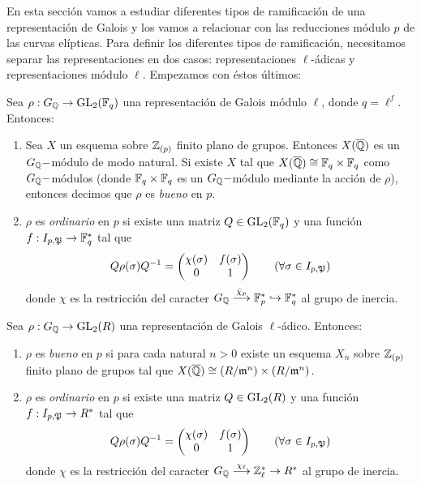 En esta secci\'on vamos a estudiar diferentes tipos de ramificaci\'on de una representaci\'on de
Galois y los vamos a relacionar con las reducciones m\'odulo $p$ de las curvas el\'ipticas. Para
definir los diferentes tipos de ramificaci\'on, necesitamos separar las representaciones en dos
casos: representaciones $\ell$-\'adicas y representaciones m\'odulo $\ell$. Empezamos con \'estos
\'ultimos:

\begin{defin}
  Sea $\rho:G_{\mathbb{Q}}\rightarrow\mathrm{GL}_2(\mathbb{F}_{q})$ una representaci\'on de Galois m\'odulo $\ell$, donde $q=\ell^f$.
  Entonces:
  \begin{enumerate}
  \item Sea $X$ un esquema sobre $\mathbb{Z}_{(p)}$ finito plano de grupos. Entonces $X(\overline{\mathbb{Q}})$ es
    un $G_{\mathbb{Q}}-$m\'odulo de modo natural. Si existe $X$ tal que $X(\overline{\mathbb{Q}})\cong\mathbb{F}_q\times\mathbb{F}_q$
    como $G_{\mathbb{Q}}-$m\'odulos (donde $\mathbb{F}_q\times\mathbb{F}_q$ es un $G_{\mathbb{Q}}-$m\'odulo mediante la acci\'on de
    $\rho$), entonces decimos que $\rho$ es \emph{bueno} en $p$. 
  \item $\rho$ es \emph{ordinario} en $p$ si existe una matriz $Q\in\mathrm{GL}_2(\mathbb{F}_q)$ y una
    funci\'on $f:I_{p,\mathfrak{P}}\rightarrow\mathbb{F}_q^*$ tal que
    \[
      Q \rho(\sigma) Q^{-1}=\begin{pmatrix}\chi(\sigma) & f(\sigma)\\ 0&1\end{pmatrix}
      \qquad (\forall\sigma\in I_{p,\mathfrak{P}})
    \]
    donde $\chi$ es la restricci\'on del caracter
    $G_{\mathbb{Q}}\overset{\bar{\chi}_p}{\longrightarrow}\mathbb{F}_p^*\hookrightarrow\mathbb{F}_q^*$ al grupo de inercia.
  \end{enumerate}
\end{defin}

\begin{defin}
  Sea $\rho:G_{\mathbb{Q}}\rightarrow\mathrm{GL}_2(R)$ una representaci\'on de Galois $\ell$-\'adico. Entonces:
  \begin{enumerate}
  \item $\rho$ es \emph{bueno} en $p$ si para cada natural $n>0$ existe un esquema $X_n$
    sobre $\mathbb{Z}_{(p)}$ finito plano de grupos tal que $X(\overline{\mathbb{Q}})\cong(R/\mathfrak{m}^n)\times(R/\mathfrak{m}^n)$.
  \item $\rho$ es \emph{ordinario} en $p$ si existe una matriz $Q\in\mathrm{GL}_2(R)$ y una
    funci\'on $f:I_{p,\mathfrak{P}}\rightarrow R^*$ tal que
    \[
      Q \rho(\sigma) Q^{-1}=\begin{pmatrix}\chi(\sigma) & f(\sigma)\\ 0&1\end{pmatrix}
      \qquad (\forall\sigma\in I_{p,\mathfrak{P}})
    \]
    donde $\chi$ es la restricci\'on del caracter $G_{\mathbb{Q}}\overset{\chi_{\ell}}{\longrightarrow}\mathbb{Z}_{\ell}^*\rightarrow R^*$ al
    grupo de inercia.
  \end{enumerate}
\end{defin}

